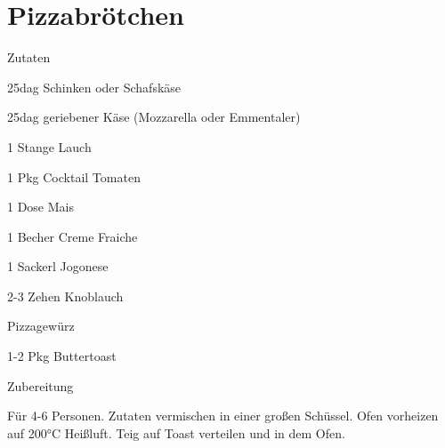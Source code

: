 \chapter*{Pizzabrötchen}
\begin{multicols}{2}
 {\Large Zutaten}
 \begin{Zutaten}
		\item 25dag Schinken oder Schafskäse
		\item 25dag geriebener Käse (Mozzarella oder
		Emmentaler)
		\item 1 Stange Lauch
		\item 1 Pkg Cocktail Tomaten
		\item 1 Dose Mais
		\item 1 Becher Creme Fraiche
		\item 1 Sackerl Jogonese
		\item 2-3 Zehen Knoblauch
		\item Pizzagewürz
		\item 1-2 Pkg Buttertoast
		
\end{Zutaten}
\columnbreak
{}
\end{multicols}

{\Large Zubereitung} \newline
\begin{addmargin}[1cm]{0cm}
	Für 4-6 Personen.\newline 
	Zutaten vermischen in einer großen Schüssel.\newline
	Ofen vorheizen auf 200°C Heißluft.\newline
	Teig auf Toast verteilen und in dem Ofen.
	

	
\end{addmargin}
